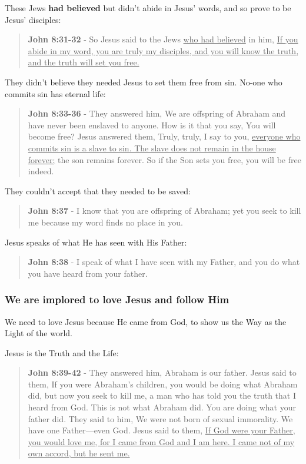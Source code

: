 \documentclass[11pt]{article}
\begin{document}
These Jews \textbf{had believed} but didn't abide in Jesus' words, and so prove to be Jesus' disciples:

\begin{quote}
\textbf{John 8:31-32} - So Jesus said to the Jews \uline{who had believed} in him, \uline{If you abide in my word, you are truly my disciples, and you will know the truth, and the truth will set you free.}
\end{quote}

They didn't believe they needed Jesus to set them free from sin. No-one who commits sin has eternal life:

\begin{quote}
\textbf{John 8:33-36} - They answered him, We are offspring of Abraham and have never been enslaved to anyone. How is it that you say, You will become free? Jesus answered them, Truly, truly, I say to you, \uline{everyone who commits sin is a slave to sin. The slave does not remain in the house forever;} the son remains forever. So if the Son sets you free, you will be free indeed.
\end{quote}

They couldn't accept that they needed to be saved:

\begin{quote}
\textbf{John 8:37} - I know that you are offspring of Abraham; yet you seek to kill me because my word finds no place in you.
\end{quote}

Jesus speaks of what He has seen with His Father:

\begin{quote}
\textbf{John 8:38} - I speak of what I have seen with my Father, and you do what you have heard from your father.
\end{quote}

\subsubsection{We are implored to love Jesus and follow Him}
\label{sec:org4313fae}
We need to love Jesus because He came from
God, to show us the Way as the Light of the
world.

Jesus is the Truth and the Life:

\begin{quote}
\textbf{John 8:39-42} - They answered him, Abraham is our father. Jesus said to them, If you were Abraham's children, you would be doing what Abraham did, but now you seek to kill me, a man who has told you the truth that I heard from God. This is not what Abraham did. You are doing what your father did. They said to him, We were not born of sexual immorality. We have one Father—even God. Jesus said to them, \uline{If God were your Father, you would love me, for I came from God and I am here. I came not of my own accord, but he sent me.}
\end{quote}
\end{document}
